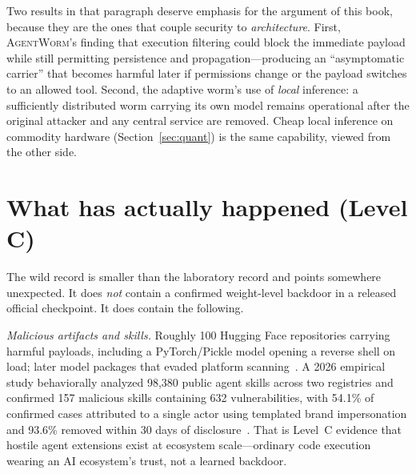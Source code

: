Two results in that paragraph deserve emphasis for the argument of this book, because they are the ones that couple security to \emph{architecture}. First, \textsc{AgentWorm}'s finding that execution filtering could block the immediate payload while still permitting persistence and propagation---producing an ``asymptomatic carrier'' that becomes harmful later if permissions change or the payload switches to an allowed tool. Second, the adaptive worm's use of \emph{local} inference: a sufficiently distributed worm carrying its own model remains operational after the original attacker and any central service are removed. Cheap local inference on commodity hardware (Section~\ref{sec:quant}) is the same capability, viewed from the other side.

\section{What has actually happened (Level C)}

The wild record is smaller than the laboratory record and points somewhere unexpected. It does \emph{not} contain a confirmed weight-level backdoor in a released official checkpoint. It does contain the following.

\emph{Malicious artifacts and skills.} Roughly 100 Hugging Face repositories carrying harmful payloads, including a PyTorch/Pickle model opening a reverse shell on load; later model packages that evaded platform scanning~\cite{pickle,order66}. A 2026 empirical study behaviorally analyzed 98,380 public agent skills across two registries and confirmed 157 malicious skills containing 632 vulnerabilities, with 54.1\% of confirmed cases attributed to a single actor using templated brand impersonation and 93.6\% removed within 30 days of disclosure~\cite{malicious-skills,order66}. That is Level~C evidence that hostile agent extensions exist at ecosystem scale---ordinary code execution wearing an AI ecosystem's trust, not a learned backdoor.

